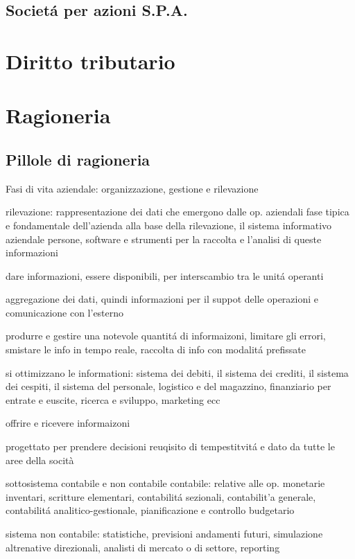 \documentclass{article}
\begin{document}
\subsection{Societ\'a per azioni S.P.A.}

\section{Diritto tributario}

\section{Ragioneria}

\subsection{Pillole di ragioneria}
Fasi di vita aziendale: organizzazione, gestione e rilevazione

rilevazione: rappresentazione dei dati che emergono dalle op. aziendali
fase tipica e fondamentale dell'azienda
alla base della rilevazione, il sistema informativo aziendale
persone, software e strumenti per la raccolta e l'analisi di queste informazioni

dare informazioni, essere disponibili, per interscambio tra le unit\'a operanti

aggregazione dei dati, quindi informazioni per il suppot delle operazioni e comunicazione con l'esterno

produrre e gestire una notevole quantit\'a di informaizoni, limitare gli errori, smistare le info in tempo reale, raccolta di info con modalit\'a prefissate

si ottimizzano le informationi: sistema dei debiti, il sistema dei crediti, il sistema dei cespiti, il sistema del personale, logistico e del magazzino, finanziario per entrate e euscite, ricerca e sviluppo, marketing ecc

offrire e ricevere informaizoni

progettato per prendere decisioni
reuqisito di tempestitvit\'a e dato da tutte le aree della socità

sottosistema contabile e non contabile
contabile: relative alle op. monetarie
inventari, scritture elementari, contabilit\'a sezionali, contabilit'a generale, contabilit\'a analitico-gestionale, pianificazione e controllo budgetario

sistema non contabile: statistiche, previsioni andamenti futuri, simulazione altrenative direzionali, analisti di mercato o di settore, reporting
\end{document}
